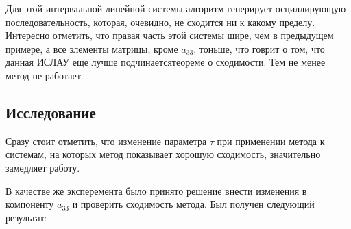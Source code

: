 \documentclass[../body.tex]{subfiles}
\begin{document}
    Для этой интервальной линейной системы алгоритм генерирует осциллирующую последовательность, которая, очевидно, не сходится ни к какому пределу. Интересно отметить, что правая часть этой системы шире, чем в предыдущем примере, а все элементы матрицы, кроме $a_{33}$, тоньше, что говрит о том, что данная ИСЛАУ еще лучше подчинаетсятеореме о сходимости. Тем не менее метод не работает.
  
  \subsection{Исследование}
    Сразу стоит отметить, что изменение параметра $\tau$ при применении метода к системам, на которых метод показывает хорошую сходимость, значительно замедляет работу.
    
    В качестве же эксперемента было принято решение внести изменения в компоненту $a_{33}$ и проверить сходимость метода. Был получен следующий результат:
\end{document}
